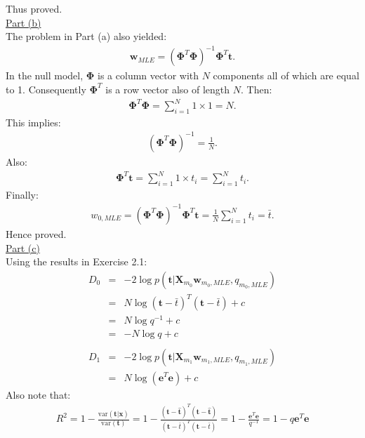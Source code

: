\documentclass[a4paper, 11pt]{article}
\begin{document}
Thus proved.\\
\newline \underline{Part (b)}\\
\newline The problem in Part (a) also yielded:
\begin{eqnarray}
\mathbf{w}_{MLE} = \left( \mathbf{\Phi}^T \mathbf{\Phi} \right)^{-1} \mathbf{\Phi}^T \mathbf{t}. \nonumber
\end{eqnarray}
In the null model, $\mathbf{\Phi}$ is a column vector with $N$ components all of which are equal to 1. Consequently $\mathbf{\Phi}^T$ is a row vector also of length $N$. Then:
\begin{eqnarray}
\mathbf{\Phi}^T \mathbf{\Phi} = \sum_{i=1}^{N} 1 \times 1 = N. \nonumber
\end{eqnarray}
This implies:
\begin{eqnarray}
\left( \mathbf{\Phi}^T \mathbf{\Phi} \right)^{-1} = \frac{1}{N}. \nonumber
\end{eqnarray}
Also:
\begin{eqnarray}
\mathbf{\Phi}^T \mathbf{t} = \sum_{i=1}^{N} 1 \times t_i = \sum_{i=1}^{N} t_i. \nonumber
\end{eqnarray}
Finally:
\begin{eqnarray}
w_{0, MLE} = \left( \mathbf{\Phi}^T \mathbf{\Phi} \right)^{-1} \mathbf{\Phi}^T \mathbf{t} = \frac{1}{N} \sum_{i=1}^{N} t_i = \bar{t}. \nonumber
\end{eqnarray}
Hence proved.\\
\newline \underline{Part (c)}\\
\newline Using the results in Exercise 2.1:
\begin{eqnarray}
D_0 &=& -2 \log p(\mathbf{t} | \mathbf{X}_{m_0} \mathbf{w}_{m_0, MLE}, q_{m_0, MLE})  \nonumber \\
&=& N \log (\mathbf{t} - \bar{t})^T (\mathbf{t} - \bar{t}) + c \nonumber \\
&=& N \log q^{-1} + c \nonumber \\
&=& - N \log q + c \nonumber \\
\nonumber \\
D_1 &=& -2 \log p(\mathbf{t} | \mathbf{X}_{m_1} \mathbf{w}_{m_1, MLE}, q_{m_1, MLE})  \nonumber \\
&=& N \log (\mathbf{e}^T \mathbf{e}) + c \nonumber
\end{eqnarray}
Also note that:
\begin{eqnarray}
R^2 = 1 - \frac{\text{var}(\mathbf{t} | \mathbf{x}) }{\text{var}(\mathbf{t})} = 1 - \frac{(\mathbf{t} - \hat{\mathbf{t}})^T (\mathbf{t} - \hat{\mathbf{t}})}{(\mathbf{t} - \bar{t})^T (\mathbf{t} - \bar{t})} = 1 - \frac{\mathbf{e}^T \mathbf{e}}{q^{-1}} = 1 - q \mathbf{e}^T \mathbf{e}  \nonumber
\end{eqnarray}
\end{document}
